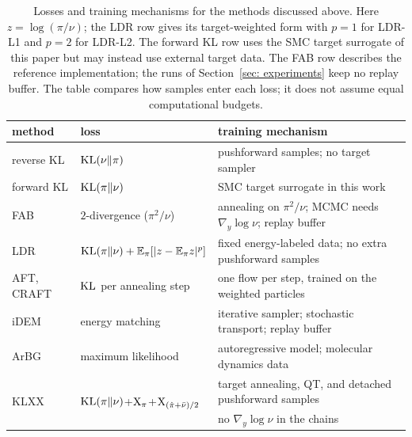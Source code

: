 \documentclass{article}
\begin{document}
\begin{table}[htb]
\centering
{\small
\begin{tabular}{@{}lll@{}}
\toprule
method & loss & training mechanism \\
\midrule
reverse KL & $\mathrm{KL}(\nu\|\pi)$ & pushforward samples; no target sampler \\
forward KL & $\mathrm{KL}(\pi\|\nu)$ & SMC target surrogate in this work \\
FAB & $2$-divergence ($\pi^2/\nu$) & annealing on $\pi^2/\nu$; MCMC needs $\nabla_y\log\nu$; replay buffer \\
LDR & $\mathrm{KL}(\pi\|\nu)+\mathbb E_\pi[|z-\mathbb E_\pi z|^p]$ & fixed energy-labeled data; no extra pushforward samples \\
AFT, CRAFT & $\mathrm{KL}$ per annealing step & one flow per step, trained on the weighted particles \\
iDEM & energy matching & iterative sampler; stochastic transport; replay buffer \\
ArBG & maximum likelihood & autoregressive model; molecular dynamics data \\
\multirow{2}{*}{KLXX} &
\multirow{2}{*}{$\mathrm{KL}(\pi\|\nu)$+$\mathrm{X}_\pi$+$\mathrm{X}_{(\hat\pi+\bar\nu)/2}$} &
target annealing, QT, and detached pushforward samples \\
& & no $\nabla_y\log\nu$ in the chains \\
\bottomrule
\end{tabular}
}
\caption{Losses and training mechanisms for the methods discussed above. Here $z=\log(\pi/\nu)$; the LDR row gives its target-weighted form with $p=1$ for LDR-L1 and $p=2$ for LDR-L2. The forward KL row uses the SMC target surrogate of this paper but may instead use external target data. The FAB row describes the reference implementation; the runs of Section~\ref{sec: experiments} keep no replay buffer. The table compares how samples enter each loss; it does not assume equal computational budgets.}
\label{tab: loss-methods}
\end{table}
\end{document}
